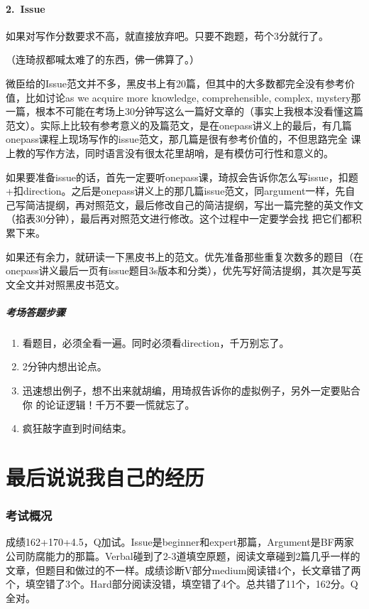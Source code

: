 \documentclass[11pt,a4paper]{article}
\begin{document}
{{{{		}
		\newpage
		\subsection*{2.~Issue}
			如果对写作分数要求不高，就直接放弃吧。只要不跑题，苟个3分就行了。
			
			（连琦叔都喊太难了的东西，佛一佛算了。）
			
			微臣给的Issue范文并不多，黑皮书上有20篇，但其中的大多数都完全没有参考价值，比如讨论as we acquire more knowledge, comprehensible, complex, mystery那一篇，根本不可能在考场上30分钟写这么一篇好文章的（事实上我根本没看懂这篇范文）。实际上比较有参考意义的及篇范文，是在onepass讲义上的最后，有几篇onepass课程上现场写作的issue范文，那几篇是很有参考价值的，不但思路完全
			课上教的写作方法，同时语言没有很太花里胡哨，是有模仿可行性和意义的。
			
			如果要准备issue的话，首先一定要听onepass课，琦叔会告诉你怎么写issue，扣题+扣direction。之后是onepass讲义上的那几篇issue范文，同argument一样，先自己写简洁提纲，再对照范文，最后修改自己的简洁提纲，写出一篇完整的英文作文（掐表30分钟），最后再对照范文进行修改。这个过程中一定要学会找
			把它们都积累下来。
			
			如果还有余力，就研读一下黑皮书上的范文。优先准备那些重复次数多的题目（在onepass讲义最后一页有issue题目3s版本和分类），优先写好简洁提纲，其次是写英文全文并对照黑皮书范文。
			
			\subsubsection*{考场答题步骤}
			\begin{enumerate}
				\item 看题目，必须全看一遍。同时必须看direction，千万别忘了。
				\item 2分钟内想出论点。
				\item 迅速想出例子，想不出来就胡编，用琦叔告诉你的虚拟例子，另外一定要贴合你	的论证逻辑！千万不要一慌就忘了。
				\item 疯狂敲字直到时间结束。
			\end{enumerate}
	}
	\newpage
	\part{最后说说我自己的经历}{
		\section*{考试概况}
			成绩162+170+4.5，Q加试。Issue是beginner和expert那篇，Argument是BF两家公司防腐能力的那篇。Verbal碰到了2-3道填空原题，阅读文章碰到2篇几乎一样的文章，但题目和做过的不一样。成绩诊断V部分medium阅读错4个，长文章错了两个，填空错了3个。Hard部分阅读没错，填空错了4个。总共错了11个，162分。Q全对。
		
}}}
\end{document}
